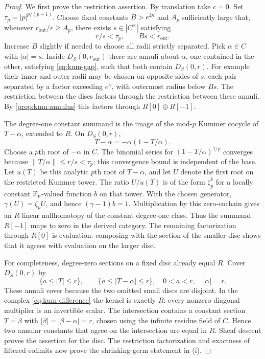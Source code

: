 \begin{proof}
We first prove the restriction assertion.  By translation take
$c=0$.  Set
$\tau_p=|p|^{p/(p-1)}$.  Choose fixed constants $B>e^{2\kappa}$
and $A_p$ sufficiently large that, whenever $r_{\mathrm{out}}/r\geq A_p$, there
exists $s\in|C^\times|$ satisfying
\[
 r/s<\tau_p,\qquad Bs<r_{\mathrm{out}}.
\]
Increase $B$ slightly if needed to choose all radii strictly
separated.  Pick $\alpha\in C$ with $|\alpha|=s$.
Inside $D_S(0,r_{\mathrm{out}})$ there are annuli about $\alpha$, one contained
in the other, satisfying \cref{eq:kum-gap}, such that both contain
$D_S(0,r)$.  For example their inner and outer radii may be chosen
on opposite sides of $s$, each pair separated by a factor exceeding
$e^\kappa$, with outermost radius below $Bs$.  The restriction
between the discs factors through the restriction between these
annuli.  By \cref{prop:kum-annulus} this factors through
$R[0]\oplus R[-1]$.

The degree-one constant summand is the image of the mod-$p$
Kummer cocycle of $T-\alpha$, extended to $R$.  On $D_S(0,r)$,
\[
 T-\alpha=-\alpha(1-T/\alpha).
\]
Choose a $p$th root of $-\alpha$ in $C$.  The binomial series for
$(1-T/\alpha)^{1/p}$ converges because
$\|T/\alpha\|\leq r/s<\tau_p$; this convergence bound is
independent of the base.  Let $u(T)$ be this analytic $p$th root of
$T-\alpha$, and let $U$ denote the first root on the restricted
Kummer tower.  The ratio $U/u(T)$ is of the form $\zeta_p^{b}$
for a locally constant $\mathbb F_p$-valued function $b$ on that tower.
With the chosen generator, $\gamma(U)=\zeta_pU$, and hence
$(\gamma-1)b=1$.  Multiplication by this zero-cochain gives
an $R$-linear nullhomotopy of the constant degree-one class.
Thus the summand $R[-1]$ maps to zero in the derived category.
The remaining factorization through
$R[0]$ is evaluation: composing with the section of the smaller
disc shows that it agrees with evaluation on the larger disc.

For completeness, degree-zero sections on a fixed disc already
equal $R$.  Cover $D_S(0,r)$ by
\[
 \{a\leq |T|\leq r\},\qquad
 \{a\leq|T-\alpha|\leq r\},
 \quad 0<a<r,\quad |\alpha|=r.
\]
These annuli cover because the two omitted small discs are
disjoint.  In the complex \cref{eq:kum-difference} the kernel is
exactly $R$: every nonzero diagonal multiplier is an invertible
scalar.  The intersection contains a constant section
$T=\beta$ with $|\beta|=|\beta-\alpha|=r$, chosen using the
infinite residue field of $C$.  Hence two annular constants that
agree on the intersection are equal in $R$.  Sheaf descent proves
the assertion for the disc.  The restriction factorization and
exactness of filtered colimits now prove the shrinking-germ
statement in (i).


\end{proof}
